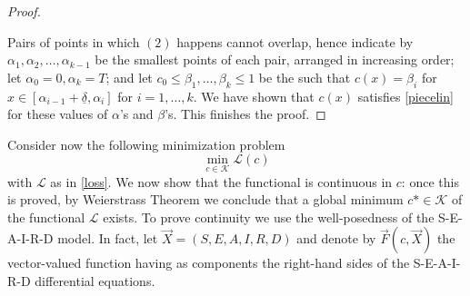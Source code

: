 \documentclass{amsart}
\begin{document}
\begin{proof}
\begin{enumerate}
\end{enumerate}
Pairs of points in which $(2)$ happens cannot overlap,
hence indicate by $\alpha_1, \alpha_2, \dots, \alpha_{k-1}$
be  the smallest points of each pair, arranged in increasing
order; 
let $\alpha_0=0, \alpha_k=T$;
and let $c_0\leq \beta_1, \dots, \beta_k\leq 1$
be the such that $c(x)=\beta_i$ for $x \in [\alpha_{i-1}+
\underline \delta,
\alpha_i]$ for $i=1, \dots, k$. We have shown that
$c(x)$ satisfies \eqref{piecelin} for these values
of $\alpha$'s and $\beta$'s.
This finishes the proof.

\end{proof}

Consider now the following minimization problem 
$$
\min_{c\in\mathcal{K}}\mathcal{L}(c)
$$
with $\mathcal{L}$ as in \eqref{loss}.
We now show that the functional is continuous in $c$: once this is proved, by Weierstrass Theorem we conclude that a global minimum $c*\in\mathcal{K}$ of the functional $\mathcal{L}$ exists.
To prove continuity we use the well-posedness of the S-E-A-I-R-D  model.
In fact, let $\Vec{X}=(S,E,A,I,R,D)$  and denote by $\Vec{F}(c,\Vec{X})$ the vector-valued function having as components the right-hand sides of the S-E-A-I-R-D differential equations.
\end{document}
